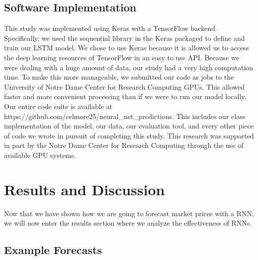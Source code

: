 \documentclass[sigconf]{acmart}
\begin{document}
\subsection{Software Implementation}
This study was implemented using Keras with a TensorFlow backend. Specifically, we used the sequential library in the Keras packaged to define and train our LSTM model. We chose to use Keras because it is allowed us to access the deep learning resources of TensorFlow in an easy to use API. Because we were dealing with a huge amount of data, our study had a very high computation time. To make this more manageable, we submitted our code as jobs to the University of Notre Dame Center for Research Computing GPUs. This allowed faster and more convenient processing than if we were to run our model locally. Our entire code suite  is available at https://github.com/celmore25/neural\_net\_predictions. This includes our class implementation of the model, our data, our evaluation tool, and every other piece of code we wrote in pursuit of completing this study. This research was supported in part by the Notre Dame Center for Research Computing through the use of available GPU systems. 

\section{Results and Discussion}
\label{sec:results}

Now that we have shown how we are going to forecast market prices with a RNN, we will now enter the results section where we analyze the effectiveness of RNNs. 

\subsection{Example Forecasts}
\end{document}
